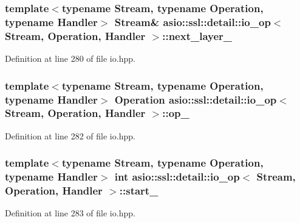 \subsubsection[{next\+\_\+layer\+\_\+}]{\setlength{\rightskip}{0pt plus 5cm}template$<$typename Stream, typename Operation, typename Handler$>$ Stream\& {\bf asio\+::ssl\+::detail\+::io\+\_\+op}$<$ Stream, Operation, Handler $>$\+::next\+\_\+layer\+\_\+}\label{classasio_1_1ssl_1_1detail_1_1io__op_ac9a971480ecb8df84bedc0d891172c63}


Definition at line 280 of file io.\+hpp.

\hypertarget{classasio_1_1ssl_1_1detail_1_1io__op_aa3fa2b3e3ad0ee8aa4724a9f1dc9a307}{}
\subsubsection[{op\+\_\+}]{\setlength{\rightskip}{0pt plus 5cm}template$<$typename Stream, typename Operation, typename Handler$>$ Operation {\bf asio\+::ssl\+::detail\+::io\+\_\+op}$<$ Stream, Operation, Handler $>$\+::op\+\_\+}\label{classasio_1_1ssl_1_1detail_1_1io__op_aa3fa2b3e3ad0ee8aa4724a9f1dc9a307}


Definition at line 282 of file io.\+hpp.

\hypertarget{classasio_1_1ssl_1_1detail_1_1io__op_a447be685fcda22c40259253c5c276543}{}
\subsubsection[{start\+\_\+}]{\setlength{\rightskip}{0pt plus 5cm}template$<$typename Stream, typename Operation, typename Handler$>$ int {\bf asio\+::ssl\+::detail\+::io\+\_\+op}$<$ Stream, Operation, Handler $>$\+::start\+\_\+}\label{classasio_1_1ssl_1_1detail_1_1io__op_a447be685fcda22c40259253c5c276543}


Definition at line 283 of file io.\+hpp.

\hypertarget{classasio_1_1ssl_1_1detail_1_1io__op_a8046c9964a8fd25d82af1c7008c10aed}{}
